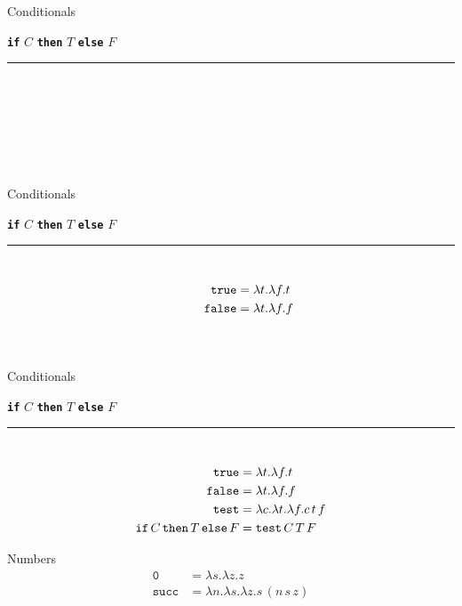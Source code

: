 \documentclass{beamer}
\newcommand{\kw}[1]{{\bf \texttt{#1}}}
\newcommand{\mkw}[1]{{\bf \mathtt{#1}}}
\newcommand{\msym}[1]{\mathtt{#1}}
\newcommand{\hr}[0]{\rule{10.75cm}{0.4pt}\\}
\begin{document}
\begin{frame}{Conditionals}
\begin{center}
\kw{if} $C$ \kw{then} $T$ \kw{else} $F$
\end{center}
\hr
\begin{align*}
\phantom{\msym{true}  = \lambda t.\lambda f.t} \\
\phantom{\msym{false} = \lambda t.\lambda f.f} \\
\phantom{\msym{test} = \lambda c.\lambda t.\lambda f.c\,t\,f} \\
\phantom{\mkw{if}\,C\,\mkw{then}\,T\,\mkw{else}\,F = \msym{test}\,C\,T\,F}
\end{align*}
\end{frame}
\begin{frame}{Conditionals}
\begin{center}
\kw{if} $C$ \kw{then} $T$ \kw{else} $F$
\end{center}
\hr
\begin{align*}
\msym{true}  &= \lambda t.\lambda f.t \\
\msym{false} &= \lambda t.\lambda f.f
\phantom{\msym{test} = \lambda c.\lambda t.\lambda f.c\,t\,f} \\\\
\phantom{\mkw{if}\,C\,\mkw{then}\,T\,\mkw{else}\,F = \msym{test}\,C\,T\,F}
\end{align*}
\end{frame}
\begin{frame}{Conditionals}
\begin{center}
\kw{if} $C$ \kw{then} $T$ \kw{else} $F$
\end{center}
\hr
\begin{align*}
\msym{true}  &= \lambda t.\lambda f.t \\
\msym{false} &= \lambda t.\lambda f.f \\
\msym{test} &= \lambda c.\lambda t.\lambda f.c\,t\,f \\
\mkw{if}\,C\,\mkw{then}\,T\,\mkw{else}\,F &= \msym{test}\,C\,T\,F
\end{align*}
\end{frame}
\begin{frame}{Numbers}
\begin{align*}
\msym{0}    &= \lambda s.\lambda z.z \\
\msym{succ} &= \lambda n.\lambda s.\lambda z.s\,(n\,s\,z)
\end{align*}
\end{frame}
\end{document}

